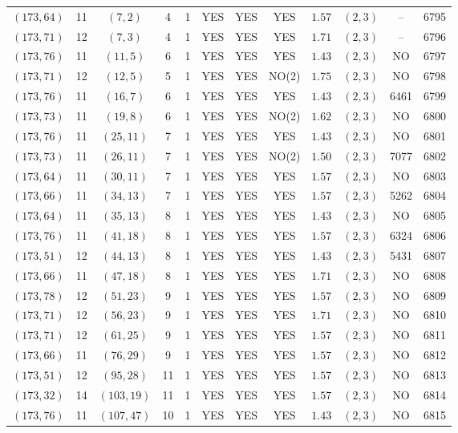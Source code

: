 \begin{longtable}{|c|c|c|c|c|c|c|c|c|c|c|c|}
$(173,64)$ & 11 & $(7,2)$ & 4 & 1 & YES & YES & YES & $1.57$ & $(2,3)$ & -- & 6795\\
$(173,71)$ & 12 & $(7,3)$ & 4 & 1 & YES & YES & YES & $1.71$ & $(2,3)$ & -- & 6796\\
$(173,76)$ & 11 & $(11,5)$ & 6 & 1 & YES & YES & YES & $1.43$ & $(2,3)$ & NO & 6797\\
$(173,71)$ & 12 & $(12,5)$ & 5 & 1 & YES & YES & NO(2) & $1.75$ & $(2,3)$ & NO & 6798\\
$(173,76)$ & 11 & $(16,7)$ & 6 & 1 & YES & YES & YES & $1.43$ & $(2,3)$ & 6461 & 6799\\
$(173,73)$ & 11 & $(19,8)$ & 6 & 1 & YES & YES & NO(2) & $1.62$ & $(2,3)$ & NO & 6800\\
$(173,76)$ & 11 & $(25,11)$ & 7 & 1 & YES & YES & YES & $1.43$ & $(2,3)$ & NO & 6801\\
$(173,73)$ & 11 & $(26,11)$ & 7 & 1 & YES & YES & NO(2) & $1.50$ & $(2,3)$ & 7077 & 6802\\
$(173,64)$ & 11 & $(30,11)$ & 7 & 1 & YES & YES & YES & $1.57$ & $(2,3)$ & NO & 6803\\
$(173,66)$ & 11 & $(34,13)$ & 7 & 1 & YES & YES & YES & $1.57$ & $(2,3)$ & 5262 & 6804\\
$(173,64)$ & 11 & $(35,13)$ & 8 & 1 & YES & YES & YES & $1.43$ & $(2,3)$ & NO & 6805\\
$(173,76)$ & 11 & $(41,18)$ & 8 & 1 & YES & YES & YES & $1.57$ & $(2,3)$ & 6324 & 6806\\
$(173,51)$ & 12 & $(44,13)$ & 8 & 1 & YES & YES & YES & $1.43$ & $(2,3)$ & 5431 & 6807\\
$(173,66)$ & 11 & $(47,18)$ & 8 & 1 & YES & YES & YES & $1.71$ & $(2,3)$ & NO & 6808\\
$(173,78)$ & 12 & $(51,23)$ & 9 & 1 & YES & YES & YES & $1.57$ & $(2,3)$ & NO & 6809\\
$(173,71)$ & 12 & $(56,23)$ & 9 & 1 & YES & YES & YES & $1.71$ & $(2,3)$ & NO & 6810\\
$(173,71)$ & 12 & $(61,25)$ & 9 & 1 & YES & YES & YES & $1.57$ & $(2,3)$ & NO & 6811\\
$(173,66)$ & 11 & $(76,29)$ & 9 & 1 & YES & YES & YES & $1.57$ & $(2,3)$ & NO & 6812\\
$(173,51)$ & 12 & $(95,28)$ & 11 & 1 & YES & YES & YES & $1.57$ & $(2,3)$ & NO & 6813\\
$(173,32)$ & 14 & $(103,19)$ & 11 & 1 & YES & YES & YES & $1.57$ & $(2,3)$ & NO & 6814\\
$(173,76)$ & 11 & $(107,47)$ & 10 & 1 & YES & YES & YES & $1.43$ & $(2,3)$ & NO & 6815\\

\end{longtable}
